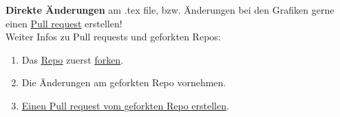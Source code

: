 \documentclass[a4paper, 11pt, parskip=half]{scrartcl}
\begin{document}
\vspace{5mm}
\textbf{Direkte Änderungen} am .tex file, bzw. Änderungen bei den Grafiken gerne einen \href{https://github.com/etschgi1/Ex2_Fragen/pulls}{\underline{Pull request}} erstellen!\\
Weiter Infos zu Pull requests und geforkten Repos:\\
 \begin{enumerate}
    \item Das \href{https://github.com/etschgi1/Ex2_Fragen}{\underline{Repo}} zuerst \href{https://docs.github.com/en/get-started/quickstart/fork-a-repo}{\underline{forken}}.
    \item Die Änderungen am geforkten Repo vornehmen.
    \item \href{https://docs.github.com/en/github/collaborating-with-pull-requests/proposing-changes-to-your-work-with-pull-requests/creating-a-pull-request-from-a-fork}{\underline{Einen Pull request vom geforkten Repo erstellen}}.
\end{enumerate}
\end{document}
